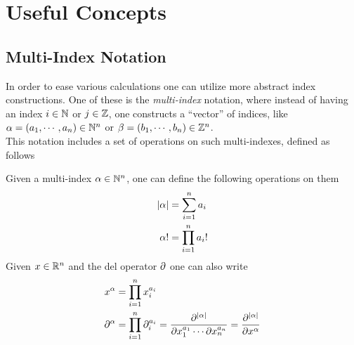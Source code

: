 \documentclass[../complete.tex]{subfiles}
\begin{document}
\chapter{Useful Concepts}
\section{Multi-Index Notation}
In order to ease various calculations one can utilize more abstract index constructions. One of these is the \textit{multi-index} notation, where instead of having an index $i\in\mathbb{N}$ or $j\in\mathbb{Z}$, one constructs a ``vector'' of indices, like $\alpha=(a_1,\cdots,a_n)\in\mathbb{N}^n$ or $\beta=(b_1,\cdots,b_n)\in\mathbb{Z}^n$.\\
This notation includes a set of operations on such multi-indexes, defined as follows
\begin{thm}
	Given a multi-index $\alpha\in\mathbb{N}^n$, one can define the following operations on them
	\begin{equation}
		\begin{aligned}
			\abs{\alpha}&=\sum_{i=1}^na_i\\
			\alpha!&=\prod_{i=1}^na_i!
		\end{aligned}
		\label{eq:multiindexop}
	\end{equation}
	Given $x\in\mathbb{R}^n$ and the del operator $\partial$ one can also write
	\begin{equation}
		\begin{aligned}
			x^\alpha&=\prod_{i=1}^nx_i^{a_i}\\
			\partial^\alpha&=\prod_{i=1}^n\partial_i^{a_i}=\frac{\partial^{\abs{\alpha}}}{\partial x_1^{a_1}\cdots\partial x_n^{a_n}}=\frac{\partial^{\abs{\alpha}}}{\partial x^\alpha}
		\end{aligned}
		\label{eq:vecsandmultiindex}
	\end{equation}
\end{thm}
\end{document}
